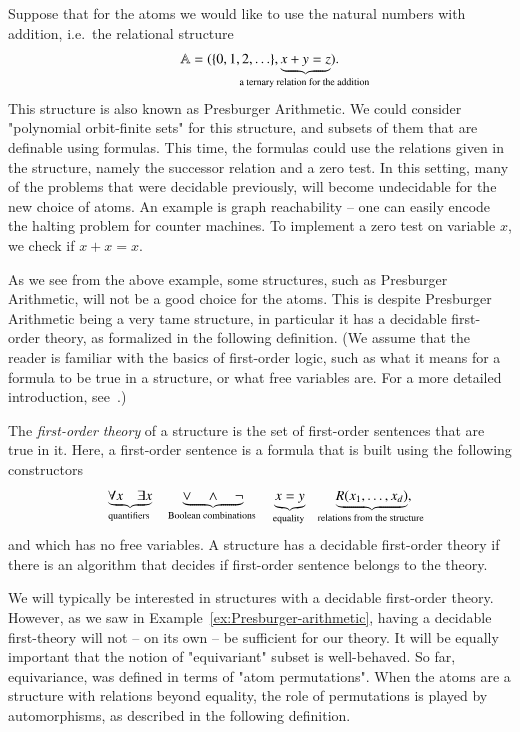\begin{myexample}\label{ex:Presburger-arithmetic}
	Suppose that for the atoms we would like to use the natural numbers with addition, i.e.~the relational structure 
	\begin{align*}
		\atoms = (\set{0,1,2,\ldots}, \myunderbrace{x + y = z}{a ternary relation for the addition}).
	\end{align*}
	This structure is also known as Presburger Arithmetic. 
	We could consider "polynomial orbit-finite sets" for this structure, and subsets of them that are definable using formulas. This time, the formulas could use the relations given in the structure, namely the successor relation and a zero test. In this setting, many of the problems that were decidable previously, will become undecidable for the new choice of atoms. An example is graph reachability -- one can easily encode the halting problem for counter machines. To implement a zero test on variable $x$, we check if $x+x=x$.
\end{myexample}

As we see from the above example, some structures, such as Presburger Arithmetic, will not be a good choice for the atoms. This is despite Presburger Arithmetic being a very tame structure, in particular it has a decidable first-order theory, as formalized in the following definition. (We assume that the reader is familiar with the basics of first-order logic, such as what it means for a formula to be true in a structure, or what free variables are. For a more detailed introduction, see~\cite{hodges1993model}.)

\begin{definition}
	The \emph{first-order theory} of a structure is the set of first-order sentences that are true in it. Here, a first-order sentence is a formula that is built using the following constructors
	\begin{align*}
	\myunderbrace{\forall x \quad \exists x}{quantifiers}
	\qquad 
	\myunderbrace{\lor \quad \land \quad \neg}{Boolean combinations}
	\qquad
	\myunderbrace{x=y}{equality}
	\qquad 
	\myunderbrace{R(x_1,\ldots,x_d)}{relations from the structure},
	\end{align*}
	and which has no free variables. A structure has a decidable first-order theory if  there is an algorithm that decides if  first-order sentence  belongs to the theory. 
\end{definition}

 We will typically be interested in structures with a decidable first-order theory. However, as we saw in Example~\ref{ex:Presburger-arithmetic}, having a decidable first-theory will not -- on its own -- be sufficient for our theory. It will be equally important that the notion of "equivariant" subset is  well-behaved.
So far,  equivariance,  was defined in terms of "atom permutations". When the atoms are a structure with relations beyond equality,  the role of permutations is played by automorphisms, as described in the following definition. 

